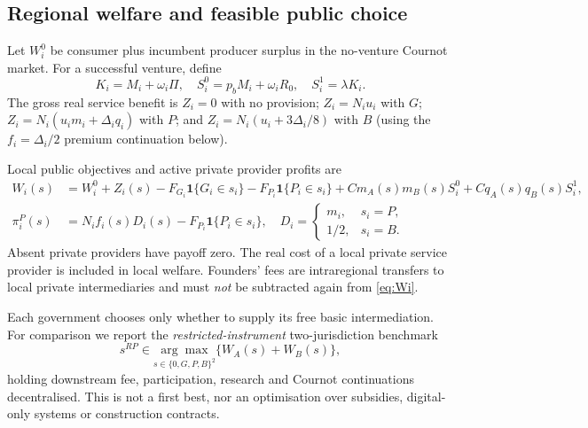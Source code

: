 \subsection{Regional welfare and feasible public choice}\label{sec:accounts}
Let $W_i^0$ be consumer plus incumbent producer surplus in the no-venture Cournot market. For a successful venture, define
\begin{equation}
 K_i=M_i+\omega_i\Pi,\quad
 S_i^0=p_b M_i+\omega_iR_0,\quad
 S_i^1=\lambda K_i.
 \label{eq:KSi}
\end{equation}
The gross real service benefit is $Z_i=0$ with no provision; $Z_i=N_iu_i$ with $G$; $Z_i=N_i(u_i m_i+\Delta_iq_i)$ with $P$; and $Z_i=N_i(u_i+3\Delta_i/8)$ with $B$ (using the $f_i=\Delta_i/2$ premium continuation below).

Local public objectives and active private provider profits are
\begin{align}
 W_i(s)&=W_i^0+Z_i(s)
       -F_{G_i}\mathbf1\{G_i\in s_i\}
       -F_{P_i}\mathbf1\{P_i\in s_i\}
       +Cm_A(s)m_B(s)S_i^0+Cq_A(s)q_B(s)S_i^1,
       \label{eq:Wi}\\
 \pi_i^P(s)&=N_if_i(s)D_i(s)-F_{P_i}\mathbf1\{P_i\in s_i\},
 \quad D_i=\begin{cases}m_i,&s_i=P,\\1/2,&s_i=B.\end{cases}
 \label{eq:privateprofit}
\end{align}
Absent private providers have payoff zero. The real cost of a local private service provider is included in local welfare. Founders' fees are intraregional transfers to local private intermediaries and must \emph{not} be subtracted again from \eqref{eq:Wi}.

Each government chooses only whether to supply its free basic intermediation. For comparison we report the \emph{restricted-instrument} two-jurisdiction benchmark
\begin{equation}
 s^{RP}\in\underset{s\in\{0,G,P,B\}^2}{\arg\max}
       \{W_A(s)+W_B(s)\},
 \label{eq:planner}
\end{equation}
holding downstream fee, participation, research and Cournot continuations decentralised. This is not a first best, nor an optimisation over subsidies, digital-only systems or construction contracts.
